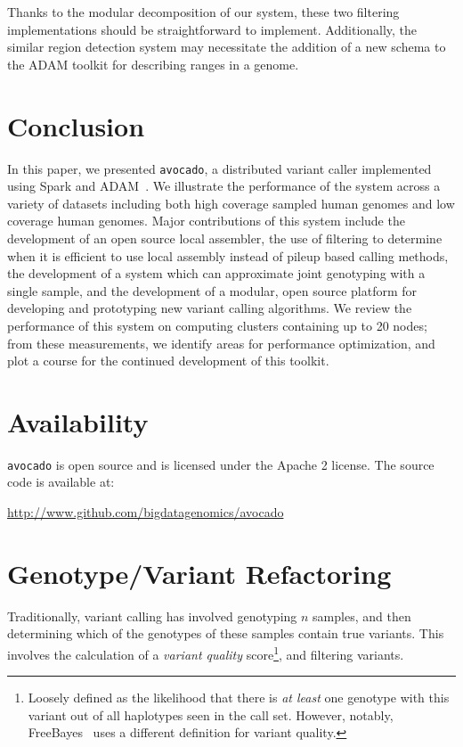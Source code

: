 \documentclass{acm_proc_article-sp}
\begin{document}
Thanks to the modular decomposition of our system, these two filtering implementations should be straightforward to implement.
Additionally, the similar region detection system may necessitate the addition of a new schema to the ADAM toolkit for describing
ranges in a genome.

\section{Conclusion}
\label{sec:conclusion}

In this paper, we presented \texttt{avocado}, a distributed variant caller implemented using Spark and ADAM~\cite{zaharia10, massie13}.
We illustrate the performance of the system across a variety of datasets including both high coverage sampled human genomes and
low coverage human genomes. Major contributions of this system include the development of an open source local assembler, the use
of filtering to determine when it is efficient to use local assembly instead of pileup based calling methods, the development of a system
which can approximate joint genotyping with a single sample, and the development of a modular, open source platform for developing
and prototyping new variant calling algorithms. We review the performance of this system on computing clusters containing up to 20 nodes;
from these measurements, we identify areas for performance optimization, and plot a course for the continued development of this toolkit.

\appendix

\section{Availability}
\label{sec:availability}

\texttt{avocado} is open source and is licensed under the Apache 2 license. The source code is available at:

\url{http://www.github.com/bigdatagenomics/avocado}

\section{Genotype/Variant Refactoring}
\label{sec:genotype-variant-refactoring}

Traditionally, variant calling has involved genotyping $n$ samples, and then determining which of the genotypes of these samples
contain true variants. This involves the calculation of a \textit{variant quality} score\footnote{Loosely defined as the likelihood that
there is \emph{at least} one genotype with this variant out of all haplotypes seen in the call set. However, notably,
FreeBayes~\cite{garrison12} uses a different definition for variant quality.}, and filtering variants.
\end{document}
